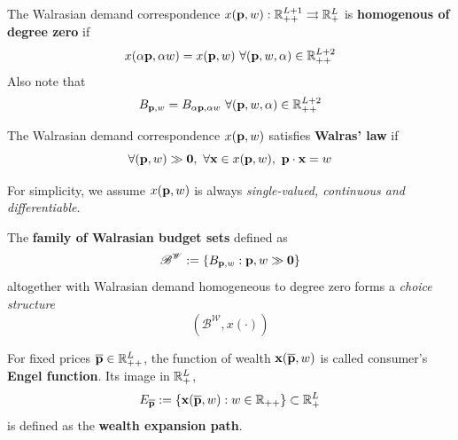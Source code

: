 \documentclass{article}
\begin{document}
 			\begin{definition}[2.E.1]
 				The Walrasian demand correspondence $x(\textbf{p}, w): \mathbb{R}_{++}^{L+1} \rightrightarrows \mathbb{R}_+^L$ is \textbf{homogenous of degree zero} if 
 				\begin{equation}
 					x(\alpha \textbf{p}, \alpha w) = x(\textbf{p}, w)\ \forall (\textbf{p}, w, \alpha) \in \mathbb{R}_{++}^{L+2}
 				\end{equation}
 				Also note that
 				\begin{equation}
 					B_{\textbf{p}, w} = B_{\alpha \textbf{p}, \alpha w}\ \forall (\textbf{p}, w, \alpha) \in \mathbb{R}_{++}^{L+2}
 				\end{equation}
 			\end{definition}
 			
 			\begin{definition}[2.E.2]
 				The Walrasian demand correspondence $x(\textbf{p}, w)$ satisfies \textbf{Walras' law} if
 				\begin{equation}
 					\forall (\textbf{p}, w) \gg \textbf{0},\ \forall \textbf{x} \in x(\textbf{p}, w),\ \textbf{p} \cdot \textbf{x} = w
 				\end{equation}
 			\end{definition}
 			
 			\begin{assumption}
 				For simplicity, we assume $x(\textbf{p}, w)$ is always \emph{single-valued, continuous and differentiable}.
 			\end{assumption}
 			
 			\begin{proposition}
 				The \textbf{family of Walrasian budget sets} defined as
 				\begin{equation}
 					\mathscr{B}^{\mathscr{W}} := \{B_{\textbf{p}, w}: {\textbf{p}, w} \gg \textbf{0}\}
 				\end{equation}
 				altogether with Walrasian demand homogeneous to degree zero forms a \emph{choice structure}
 				\begin{equation}
 					(\mathscr{B}^{\mathscr{W}}, x(\cdot))
 				\end{equation} 
 			\end{proposition}
 		
 			\begin{definition}
 				For fixed prices $\overline{\textbf{p}} \in \mathbb{R}_{++}^L$, the function of wealth $\textbf{x}(\overline{\textbf{p}}, w)$ is called consumer's \textbf{Engel function}. Its image in $\mathbb{R}^L_+$,
 				\begin{equation}
 					E_{\overline{\textbf{p}}} := \{\textbf{x}(\overline{\textbf{p}}, w): w \in \mathbb{R}_{++}\} \subset \mathbb{R}^L_+
 				\end{equation}
 				is defined as the \textbf{wealth expansion path}.
 			\end{definition}
 			
\end{document}
